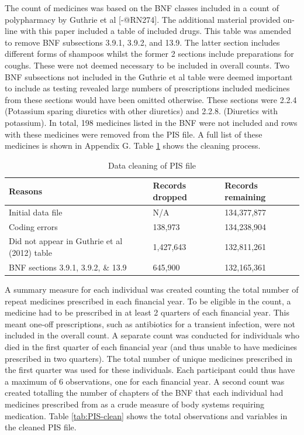 \documentclass[]{article}
\begin{document}
The count of medicines was based on the BNF classes included in a count
of polypharmacy by Guthrie et al {[}-@RN274{]}. The additional material
provided on-line with this paper included a table of included drugs.
This table was amended to remove BNF subsections 3.9.1, 3.9.2, and 13.9.
The latter section includes different forms of shampoos whilst the
former 2 sections include preparations for coughs. These were not deemed
necessary to be included in overall counts. Two BNF subsections not
included in the Guthrie et al table were deemed important to include as
testing revealed large numbers of prescriptions included medicines from
these sections would have been omitted otherwise. These sections were
2.2.4 (Potassium sparing diuretics with other diuretics) and 2.2.8.
(Diuretics with potassium). In total, 198 medicines listed in the BNF
were not included and rows with these medicines were removed from the
PIS file. A full list of these medicines is shown in Appendix G. Table
\ref{tab:dropped-meds} shows the cleaning process.

\begin{table}[h]
\centering
\caption{Data cleaning of PIS file}
\label{tab:dropped-meds}
\begin{tabular}{@{}lll@{}}
\toprule
Reasons & Records dropped & Records remaining \\ \midrule
Initial data file & N/A & 134,377,877 \\
Coding errors & 138,973 & 134,238,904 \\
Did not appear in Guthrie et al (2012) table & 1,427,643 & 132,811,261 \\
BNF sections 3.9.1, 3.9.2, \& 13.9 & 645,900 & 132,165,361 \\ \bottomrule
\end{tabular}
\end{table}

A summary measure for each individual was created counting the total
number of repeat medicines prescribed in each financial year. To be
eligible in the count, a medicine had to be prescribed in at least 2
quarters of each financial year. This meant one-off prescriptions, such
as antibiotics for a transient infection, were not included in the
overall count. A separate count was conducted for individuals who died
in the first quarter of each financial year (and thus unable to have
medicines prescribed in two quarters). The total number of unique
medicines prescribed in the first quarter was used for these
individuals. Each participant could thus have a maximum of 6
observations, one for each financial year. A second count was created
totalling the number of chapters of the BNF that each individual had
medicines prescribed from as a crude measure of body systems requiring
medication. Table \ref{tab:PIS-clean} shows the total observations and
variables in the cleaned PIS file.
\end{document}
